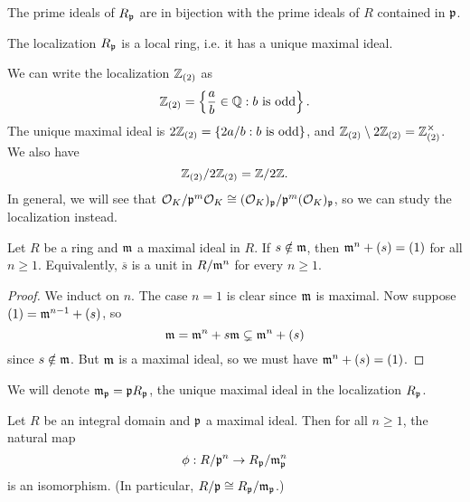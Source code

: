\begin{corollary}
  The prime ideals of $R_{\mathfrak{p}}$ are in bijection
  with the prime ideals of $R$ contained in $\mathfrak{p}$.
\end{corollary}

\begin{corollary}
  The localization $R_{\mathfrak{p}}$ is a local ring,
  i.e. it has a unique maximal ideal.
\end{corollary}

\begin{example}
  We can write the localization $\mathbb{Z}_{(2)}$ as
  \[
    \mathbb{Z}_{(2)} = \left\{ \frac{a}{b} \in \mathbb{Q} : \text{$b$ is odd} \right\}.
  \]
  The unique maximal ideal is $2 \mathbb{Z}_{(2)} = \{2 a / b : \text{$b$ is odd}\}$, and
  $\mathbb{Z}_{(2)} \setminus 2\mathbb{Z}_{(2)} = \mathbb{Z}_{(2)}^\times$. We
  also have
  \[
    \mathbb{Z}_{(2)} / 2\mathbb{Z}_{(2)} = \mathbb{Z} / 2\mathbb{Z}.
  \]
  In general, we will see that
  $\mathcal{O}_K / \mathfrak{p}^m \mathcal{O}_K \cong (\mathcal{O}_K)_{\mathfrak{p}} / \mathfrak{p}^m (\mathcal{O}_K)_{\mathfrak{p}}$,
  so we can study the localization instead.
\end{example}

\begin{lemma}
  Let $R$ be a ring and $\mathfrak{m}$ a maximal ideal in $R$.
  If $s \notin \mathfrak{m}$, then $\mathfrak{m}^n + (s) = (1)$ for all
  $n \ge 1$.
  Equivalently, $\overline{s}$ is a unit in
  $R / \mathfrak{m}^n$ for every $n \ge 1$.
\end{lemma}

\begin{proof}
  We induct on $n$. The case $n = 1$ is clear since
  $\mathfrak{m}$ is maximal. Now suppose
  $(1) = \mathfrak{m}^{n - 1} + (s)$, so
  \[
    \mathfrak{m} = \mathfrak{m}^n + s \mathfrak{m} \subsetneq \mathfrak{m}^n + (s)
  \]
  since $s \notin \mathfrak{m}$. But $\mathfrak{m}$ is a maximal ideal, so
  we must have $\mathfrak{m}^n + (s) = (1)$.
\end{proof}

\begin{remark}
  We will denote $\mathfrak{m}_{\mathfrak{p}} = \mathfrak{p} R_{\mathfrak{p}}$, the unique
  maximal ideal in the localization $R_{\mathfrak{p}}$.
\end{remark}

\begin{lemma}
  Let $R$ be an integral domain and $\mathfrak{p}$ a maximal
  ideal. Then for all $n \ge 1$, the natural map
  \[
    \phi : R / \mathfrak{p}^n \to R_{\mathfrak{p}} / \mathfrak{m}_{\mathfrak{p}}^n
  \]
  is an isomorphism. (In particular,
  $R / \mathfrak{p} \cong R_{\mathfrak{p}} / \mathfrak{m}_{\mathfrak{p}}$.)
\end{lemma}

